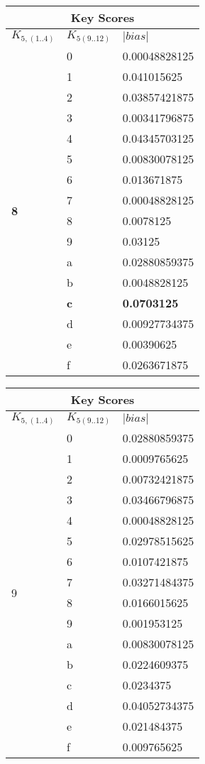 \documentclass{elsart}
\begin{document}
\begin{tabular}{|l|l|l|}
\hline
\multicolumn{3}{|c|}{Key Scores} \\
\hline
$K_{5,(1..4)}$ & $K_{5(9..12)}$ & $|bias|$  \\ \hline
 \multirow{16}{*}{\textbf{8}} & 0 & 0.00048828125 \\
 & 1 & 0.041015625 \\
 & 2 & 0.03857421875 \\
 & 3 & 0.00341796875 \\
 & 4 & 0.04345703125 \\
 & 5 & 0.00830078125 \\
 & 6 & 0.013671875 \\
 & 7 & 0.00048828125 \\
 & 8 & 0.0078125 \\
 & 9 & 0.03125 \\
 & a & 0.02880859375 \\
 & b & 0.0048828125 \\
 & \textbf{c} & \textbf{0.0703125} \\
 & d & 0.00927734375 \\
 & e & 0.00390625 \\
 & f & 0.0263671875 \\ \hline
\end{tabular}
\begin{tabular}{|l|l|l|}
\hline
\multicolumn{3}{|c|}{Key Scores} \\
\hline
$K_{5,(1..4)}$ & $K_{5(9..12)}$ & $|bias|$  \\ \hline
 \multirow{16}{*}{9} & 0 & 0.02880859375 \\
 & 1 & 0.0009765625 \\
 & 2 & 0.00732421875 \\
 & 3 & 0.03466796875 \\
 & 4 & 0.00048828125 \\
 & 5 & 0.02978515625 \\
 & 6 & 0.0107421875 \\
 & 7 & 0.03271484375 \\
 & 8 & 0.0166015625 \\
 & 9 & 0.001953125 \\
 & a & 0.00830078125 \\
 & b & 0.0224609375 \\
 & c & 0.0234375 \\
 & d & 0.04052734375 \\
 & e & 0.021484375 \\
 & f & 0.009765625 \\ \hline
\end{tabular}
\end{document}
